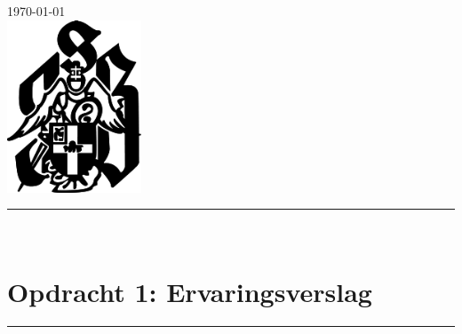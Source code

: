 \begin{titlepage}

{\large \today}\\[2cm] %


\includegraphics[width=0.3\textwidth]{Foto's/Sint_Jan_Berchmanscollege_logo2.png}\\ %

 

\vfill %

\end{titlepage}


\renewcommand*\contentsname{Inhoudstafel}

\tableofcontents
\newpage
\vspace*{\fill}
\begin{center}
\newcommand{\HRule}{\rule{\linewidth}{0.5mm}}
\HRule \\[0.4cm]
\section*{Opdracht 1: Ervaringsverslag \cite{1}}
\HRule \\[1.5cm]
\end{center}
\vspace*{\fill}
   

       

